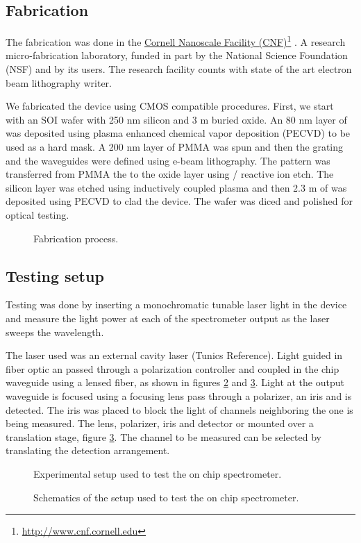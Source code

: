 \documentclass[12pt,twoside,english]{book}
\renewcommand{\~}{\perispomeni}%
\DeclareRobustCommand{\textgreek}[1]{\leavevmode{\greektext #1}}
\numberwithin{equation}{section}
\numberwithin{figure}{section}
\newcommand\fnurl[2]{%
 \href{#2}{#1}\footnote{\url{#2}}%
}
\begin{document}
\subsection{Fabrication}
\label{section:fabrication 1}
The fabrication was done in the \fnurl{Cornell Nanoscale Facility (CNF)}{http://www.cnf.cornell.edu}. A research micro-fabrication laboratory, funded in part by the National Science Foundation (NSF) and by its users. The research facility counts with state of the art electron beam lithography writer.

We fabricated the device using CMOS compatible procedures. First, we start with an SOI wafer with 250 nm silicon and 3 \textgreek{m}m buried oxide. An 80 nm layer of  was deposited using plasma enhanced chemical vapor deposition (PECVD) to be used as a hard mask. A 200 nm layer of PMMA was spun and then the grating and the waveguides were defined using e-beam lithography. The pattern was transferred from PMMA the to the oxide layer using / reactive ion etch. The silicon layer was etched using  inductively coupled plasma and then 2.3 \textgreek{m}m of  was deposited using PECVD to clad the device. The wafer was diced and polished for optical testing.
\begin{figure}[H]
\centering
\caption{Fabrication process.}
\label{fig:fabrication}
\end{figure}

\subsection{Testing setup}
Testing was done by inserting a monochromatic tunable laser light in the device and measure the light power at each of the spectrometer output as the laser sweeps the wavelength.

The laser used was an external cavity laser (Tunics Reference). Light guided in fiber optic an passed through a polarization controller and coupled in the chip waveguide using a lensed fiber, as shown in figures \ref{fig:setup photograph} and \ref{fig:setup schematics}. Light at the output waveguide is focused using a focusing lens pass through a polarizer, an iris and is detected. The iris was placed to block the light of channels neighboring the one is being measured. The lens, polarizer, iris and detector or mounted over a translation stage, figure \ref{fig:setup schematics}. The channel to be measured can be selected by translating the detection arrangement.
%
\begin{figure}[h]
\center{}
\caption{Experimental setup used to test the on chip spectrometer.}
\label{fig:setup photograph}
\end{figure}
%
\begin{figure}[h]
\center{}
\caption{Schematics of the setup used to test the on chip spectrometer.}
\label{fig:setup schematics}
\end{figure}
\end{document}
